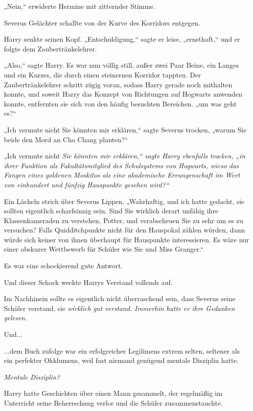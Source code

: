 {„Nein,“ erwiderte Hermine mit zitternder Stimme.

Severus Gelächter schallte von der Kurve des Korridors entgegen.

Harry senkte seinen Kopf. „Entschuldigung,“ sagte er leise, „ernsthaft,“ und er folgte dem Zaubertränkelehrer.

„Also,“ sagte Harry. Es war nun völlig still, außer zwei Paar Beine, ein Langes und ein Kurzes, die durch einen steinernen Korridor tappten. Der Zaubertränkelehrer schritt zügig voran, sodass Harry gerade noch mithalten konnte, und soweit Harry das Konzept von Richtungen auf Hogwarts anwenden konnte, entfernten sie sich von den häufig besuchten Bereichen. „um was geht es?“

„Ich vermute nicht Sie könnten mir erklären,“ sagte Severus trocken, „warum Sie beide den Mord an Cho Chang planten?“

„Ich vermute nicht \emph{Sie könnten mir erklären,“ sagte Harry ebenfalls trocken, „in ihrer Funktion als Fakultätsmitglied des Schulsystems von Hogwarts, wieso das Fangen eines goldenen Moskitos als eine akademische Errungenschaft im Wert von einhundert und fünfzig Hauspunkte gesehen wird?“}

Ein Lächeln strich über Severus Lippen. „Wahrhaftig, und ich hatte gedacht, sie sollten eigentlich scharfsinnig sein. Sind Sie wirklich derart unfähig ihre Klassenkameraden zu verstehen, Potter, und verabscheuen Sie zu sehr um es zu versuchen? Falls Quidditchpunkte nicht für den Hauspokal zählen würden, dann würde sich keiner von ihnen überhaupt für Hauspunkte interessieren. Es wäre nur einer obskurer Wettbewerb für Schüler wie Sie und Miss Granger.“

Es war eine schockierend gute Antwort.

Und dieser Schock weckte Harrys Verstand vollends auf.

Im Nachhinein sollte es eigentlich nicht überraschend sein, dass Severus seine Schüler verstand, sie \emph{wirklich gut verstand. Immerhin hatte er ihre Gedanken gelesen.}

Und...

...dem Buch zufolge war ein erfolgreicher Legilimens extrem selten, seltener als ein perfekter Okklumens, weil fast niemand genügend mentale Disziplin hatte.

\emph{Mentale Disziplin?}

Harry hatte Geschichten über einen Mann gesammelt, der regelmäßig im Unterricht seine Beherrschung verlor und die Schüler zusammenstauchte.

}
